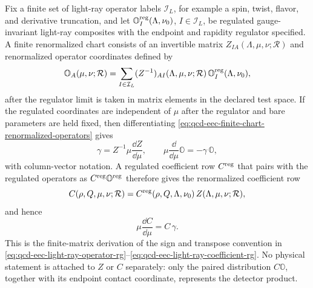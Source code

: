 Fix a finite set of light-ray operator labels \(\mathcal I_L\), for example a
spin, twist, flavor, and derivative truncation, and let
\(\mathbb O^{\rm reg}_I(\Lambda,\nu_0)\), \(I\in\mathcal I_L\), be regulated
gauge-invariant light-ray composites with the endpoint and rapidity regulator
specified.  A finite renormalized chart consists of an invertible matrix
\(Z_{IA}(\Lambda,\mu,\nu;\mathcal R)\) and renormalized operator coordinates
defined by
\begin{equation}
  \mathbb O_A(\mu,\nu;\mathcal R)
  =
  \sum_{I\in\mathcal I_L}
  (Z^{-1})_{AI}(\Lambda,\mu,\nu;\mathcal R)\,
  \mathbb O_I^{\rm reg}(\Lambda,\nu_0),
  \label{eq:qcd-eec-finite-chart-renormalized-operators}
\end{equation}
after the regulator limit is taken in matrix elements in the declared test
space.  If the regulated coordinates are independent of \(\mu\) after the
regulator and bare parameters are held fixed, then differentiating
\eqref{eq:qcd-eec-finite-chart-renormalized-operators} gives
\begin{equation}
  \gamma
  =
  Z^{-1}\mu\frac{\dd Z}{\dd\mu},
  \qquad
  \mu\frac{\dd}{\dd\mu}\mathbb O=-\gamma\,\mathbb O ,
  \label{eq:qcd-eec-finite-chart-gamma-from-z}
\end{equation}
with column-vector notation.  A regulated coefficient row \(C^{\rm reg}\)
that pairs with the regulated operators as \(C^{\rm reg}\mathbb O^{\rm reg}\)
therefore gives the renormalized coefficient row
\begin{equation}
  C(\rho,Q,\mu,\nu;\mathcal R)
  =
  C^{\rm reg}(\rho,Q,\Lambda,\nu_0)\,
  Z(\Lambda,\mu,\nu;\mathcal R),
  \label{eq:qcd-eec-finite-chart-coefficient-renormalization}
\end{equation}
and hence
\begin{equation}
  \mu\frac{\dd C}{\dd\mu}=C\,\gamma .
  \label{eq:qcd-eec-finite-chart-coefficient-rg}
\end{equation}
This is the finite-matrix derivation of the sign and transpose convention in
\eqref{eq:qcd-eec-light-ray-operator-rg}--\eqref{eq:qcd-eec-light-ray-coefficient-rg}.
No physical statement is attached to \(Z\) or \(C\) separately: only the
paired distribution \(C\mathbb O\), together with its endpoint contact
coordinate, represents the detector product.


